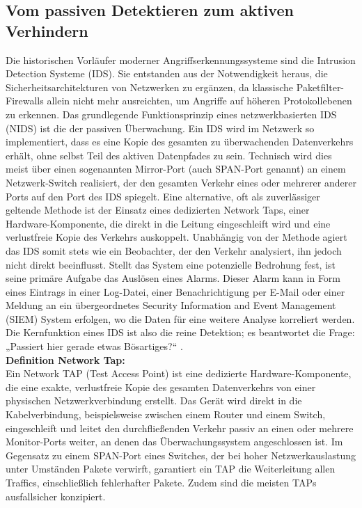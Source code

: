 \subsection{Vom passiven Detektieren zum aktiven Verhindern}

Die historischen Vorläufer moderner Angriffserkennungssysteme sind die Intrusion Detection Systeme (IDS). Sie entstanden aus der Notwendigkeit heraus, die Sicherheitsarchitekturen von Netzwerken zu ergänzen, da klassische Paketfilter-Firewalls allein nicht mehr ausreichten, um Angriffe auf höheren Protokollebenen zu erkennen. Das grundlegende Funktionsprinzip eines netzwerkbasierten IDS (NIDS) ist die der passiven Überwachung. Ein IDS wird im Netzwerk so implementiert, dass es eine Kopie des gesamten zu überwachenden Datenverkehrs erhält, ohne selbst Teil des aktiven Datenpfades zu sein. Technisch wird dies meist über einen sogenannten Mirror-Port (auch SPAN-Port genannt) an einem Netzwerk-Switch realisiert, der den gesamten Verkehr eines oder mehrerer anderer Ports auf den Port des IDS spiegelt. Eine alternative, oft als zuverlässiger geltende Methode ist der Einsatz eines dedizierten Network Taps, einer Hardware-Komponente, die direkt in die Leitung eingeschleift wird und eine verlustfreie Kopie des Verkehrs auskoppelt. Unabhängig von der Methode agiert das IDS somit stets wie ein Beobachter, der den Verkehr analysiert, ihn jedoch nicht direkt beeinflusst. Stellt das System eine potenzielle Bedrohung fest, ist seine primäre Aufgabe das Auslösen eines Alarms. Dieser Alarm kann in Form eines Eintrags in einer Log-Datei, einer Benachrichtigung per E-Mail oder einer Meldung an ein übergeordnetes Security Information and Event Management (SIEM) System erfolgen, wo die Daten für eine weitere Analyse korreliert werden. Die Kernfunktion eines IDS ist also die reine Detektion; es beantwortet die Frage: „Passiert hier gerade etwas Bösartiges?“ \cite{Claudia1}.\\

\textbf{Definition Network Tap:}\\
Ein Network TAP (Test Access Point) ist eine dedizierte Hardware-Komponente, die eine exakte, verlustfreie Kopie des gesamten Datenverkehrs von einer physischen Netzwerkverbindung erstellt. Das Gerät wird direkt in die Kabelverbindung, beispielsweise zwischen einem Router und einem Switch, eingeschleift und leitet den durchfließenden Verkehr passiv an einen oder mehrere Monitor-Ports weiter, an denen das Überwachungssystem angeschlossen ist. Im Gegensatz zu einem SPAN-Port eines Switches, der bei hoher Netzwerkauslastung unter Umständen Pakete verwirft, garantiert ein TAP die Weiterleitung allen Traffics, einschließlich fehlerhafter Pakete. Zudem sind die meisten TAPs ausfallsicher konzipiert.\cite{TAP1}\\

